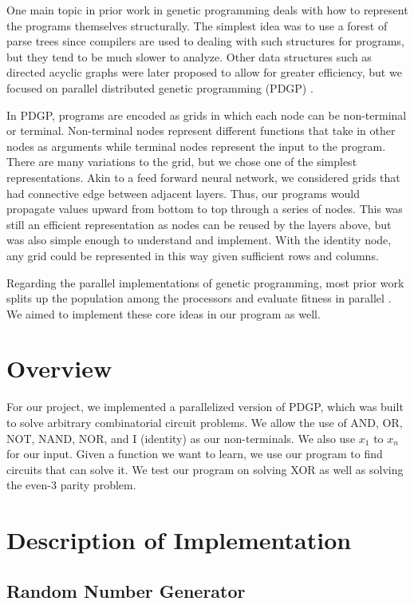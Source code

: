 \documentclass[conference]{IEEEtran}
\begin{document}
	One main topic in prior work in genetic programming deals with how to represent the programs themselves structurally. The simplest idea was to use a forest of parse trees since compilers are used to dealing with such structures for programs, but they tend to be much slower to analyze. Other data structures such as directed acyclic graphs \cite{b3} were later proposed to allow for greater efficiency, but we focused on parallel distributed genetic programming (PDGP) \cite{b2}. 
	
	In PDGP, programs are encoded as grids in which each node can be non-terminal or terminal. Non-terminal nodes represent different functions that take in other nodes as arguments while terminal nodes represent the input to the program. There are many variations to the grid, but we chose one of the simplest representations. Akin to a feed forward neural network, we considered grids that had connective edge between adjacent layers. Thus, our programs would propagate values upward from bottom to top through a series of nodes. This was still an efficient representation as nodes can be reused by the layers above, but was also simple enough to understand and implement. With the identity node, any grid could be represented in this way given sufficient rows and columns.
	
	Regarding the parallel implementations of genetic programming, most prior work splits up the population among the processors and evaluate fitness in parallel \cite{b4}. We aimed to implement these core ideas in our program as well.
	
	
	\section{Overview}
	For our project, we implemented a parallelized version of PDGP, which was built to solve arbitrary combinatorial circuit problems. We allow the use of AND, OR, NOT, NAND, NOR, and I (identity) as our non-terminals. We also use $x_1$ to $x_n$ for our input. Given a function we want to learn, we use our program to find circuits that can solve it. We test our program on solving XOR as well as solving the even-3 parity problem. 
	
	\section{Description of Implementation}
	\subsection{Random Number Generator}
\end{document}
